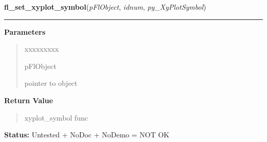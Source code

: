 \hspace{.8\funcindent}\begin{boxedminipage}{\funcwidth}

    \raggedright \textbf{fl\_set\_xyplot\_symbol}(\textit{pFlObject}, \textit{idnum}, \textit{py\_XyPlotSymbol})

    \vspace{-1.5ex}

    \rule{\textwidth}{0.5\fboxrule}
\setlength{\parskip}{2ex}
\setlength{\parskip}{1ex}
      \textbf{Parameters}
      \vspace{-1ex}

      \begin{quote}
        \begin{Ventry}{xxxxxxxxx}

          \item[pFlObject]

          pointer to object

        \end{Ventry}

      \end{quote}

      \textbf{Return Value}
    \vspace{-1ex}

      \begin{quote}
      xyplot\_symbol func

      \end{quote}

\textbf{Status:} Untested + NoDoc + NoDemo = NOT OK



    \end{boxedminipage}

    \label{xformslib:flxyplot:fl_set_xyplot_mark_active}

    \vspace{0.5ex}

